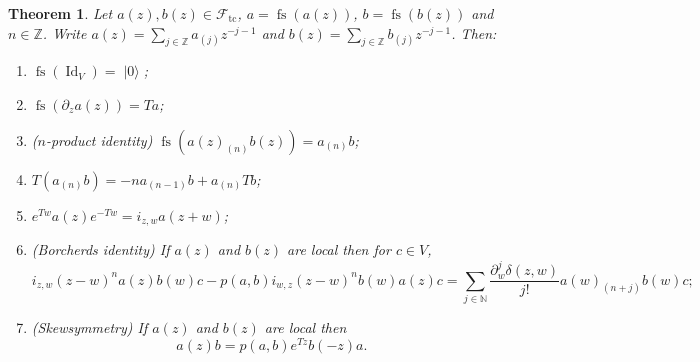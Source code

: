 \documentclass[a4paper, 12pt, reqno]{amsart}
\newtheorem{theorem}{Theorem}[section]
\theoremstyle{remark}
\numberwithin{equation}{subsection}
\DeclareMathOperator{\Id}{Id}
\DeclareMathOperator{\vac}{|0\rangle}
\DeclareMathOperator{\fs}{fs}
\DeclareMathOperator{\tc}{tc}
\begin{document}
\begin{theorem}
  \label{thr:15}
  Let $a(z), b(z) \in \mathcal{F}_{\tc}$, $a = \fs(a(z))$, $b = \fs(b(z))$ and $n \in \mathbb{Z}$.
  Write $a(z) = \sum_{j \in \mathbb{Z}}a_{(j)}z^{-j - 1}$ and $b(z) = \sum_{j \in \mathbb{Z}}b_{(j)}z^{-j - 1}$.
  Then:
  \begin{enumerate}
  \item $\fs(\Id_V) = \vac$;
  \item $\fs(\partial_za(z)) = Ta$;
  \item \emph{($n$-product identity)} $\fs(a(z)_{(n)}b(z)) = a_{(n)}b$;
  \item $T(a_{(n)}b) = -na_{(n - 1)}b + a_{(n)}Tb$;
  \item $e^{Tw}a(z)e^{-Tw} = i_{z, w}a(z + w)$;
  \item \emph{(Borcherds identity)} If $a(z)$ and $b(z)$ are local then for $c \in V$,
    \begin{equation*}
      i_{z, w}(z - w)^na(z)b(w)c - p(a, b)i_{w, z}(z - w)^nb(w)a(z)c = \sum_{j \in \mathbb{N}}\frac{\partial^j_w\delta(z, w)}{j!}a(w)_{(n + j)}b(w)c;
    \end{equation*}
  \item \emph{(Skewsymmetry)} If $a(z)$ and $b(z)$ are local then
    \begin{equation*}
      a(z)b = p(a, b)e^{Tz}b(-z)a.
    \end{equation*}
  \end{enumerate}
\end{theorem}
\end{document}
